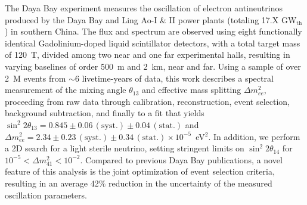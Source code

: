 The Daya Bay experiment measures the oscillation of electron antineutrinos produced by the Daya Bay and Ling Ao-I \& II power plants (totaling 17.X GW$_\mathrm{th}$) in southern China. The flux and spectrum are observed using eight functionally identical Gadolinium-doped liquid scintillator detectors, with a total target mass of 120~T, divided among two near and one far experimental halls, resulting in varying baselines of order 500~m and 2~km, near and far. Using a sample of over 2~M events from $\sim$6 livetime-years of data, this work describes a spectral measurement of the mixing angle $\theta_{13}$ and effective mass splitting $\Delta m^2_{ee}$, proceeding from raw data through calibration, reconstruction, event selection, background subtraction, and finally to a fit that yields $\sin^2 2\theta_{13} = 0.845 \pm 0.06\,\mathrm{(syst.)} \pm 0.04\,\mathrm{(stat.)}$ and $\Delta m^2_{ee} = 2.34 \pm 0.23\,\mathrm{(syst.)} \pm 0.34\,\mathrm{(stat.)} \times 10^{-5}$~eV$^2$. In addition, we perform a 2D search for a light sterile neutrino, setting stringent limits on $\sin^2 2\theta_{14}$ for $10^{-5} < \Delta m^2_{41} < 10^{-2}$. Compared to previous Daya Bay publications, a novel feature of this analysis is the joint optimization of event selection criteria, resulting in an average 42$\%$ reduction in the uncertainty of the measured oscillation parameters.